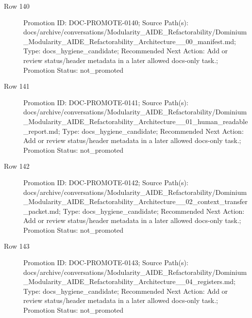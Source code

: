 \documentclass[9pt,a4paper,openany]{book}
\begin{document}
\begin{description}
\item[Row 140] Promotion ID: DOC-\allowbreak{}PROMOTE-\allowbreak{}0140; Source Path(s): docs/\allowbreak{}archive/\allowbreak{}conversations/\allowbreak{}Modularity\_\allowbreak{}AIDE\_\allowbreak{}Refactorability/\allowbreak{}Dominium\_\allowbreak{}Modularity\_\allowbreak{}AIDE\_\allowbreak{}Refactorability\_\allowbreak{}Architecture\_\allowbreak{}\_\allowbreak{}00\_\allowbreak{}manifest.\allowbreak{}md; Type: docs\_\allowbreak{}hygiene\_\allowbreak{}candidate; Recommended Next Action: Add or review status/\allowbreak{}header metadata in a later allowed docs-\allowbreak{}only task.\allowbreak{}; Promotion Status: not\_\allowbreak{}promoted
\item[Row 141] Promotion ID: DOC-\allowbreak{}PROMOTE-\allowbreak{}0141; Source Path(s): docs/\allowbreak{}archive/\allowbreak{}conversations/\allowbreak{}Modularity\_\allowbreak{}AIDE\_\allowbreak{}Refactorability/\allowbreak{}Dominium\_\allowbreak{}Modularity\_\allowbreak{}AIDE\_\allowbreak{}Refactorability\_\allowbreak{}Architecture\_\allowbreak{}\_\allowbreak{}01\_\allowbreak{}human\_\allowbreak{}readable\_\allowbreak{}report.\allowbreak{}md; Type: docs\_\allowbreak{}hygiene\_\allowbreak{}candidate; Recommended Next Action: Add or review status/\allowbreak{}header metadata in a later allowed docs-\allowbreak{}only task.\allowbreak{}; Promotion Status: not\_\allowbreak{}promoted
\item[Row 142] Promotion ID: DOC-\allowbreak{}PROMOTE-\allowbreak{}0142; Source Path(s): docs/\allowbreak{}archive/\allowbreak{}conversations/\allowbreak{}Modularity\_\allowbreak{}AIDE\_\allowbreak{}Refactorability/\allowbreak{}Dominium\_\allowbreak{}Modularity\_\allowbreak{}AIDE\_\allowbreak{}Refactorability\_\allowbreak{}Architecture\_\allowbreak{}\_\allowbreak{}02\_\allowbreak{}context\_\allowbreak{}transfer\_\allowbreak{}packet.\allowbreak{}md; Type: docs\_\allowbreak{}hygiene\_\allowbreak{}candidate; Recommended Next Action: Add or review status/\allowbreak{}header metadata in a later allowed docs-\allowbreak{}only task.\allowbreak{}; Promotion Status: not\_\allowbreak{}promoted
\item[Row 143] Promotion ID: DOC-\allowbreak{}PROMOTE-\allowbreak{}0143; Source Path(s): docs/\allowbreak{}archive/\allowbreak{}conversations/\allowbreak{}Modularity\_\allowbreak{}AIDE\_\allowbreak{}Refactorability/\allowbreak{}Dominium\_\allowbreak{}Modularity\_\allowbreak{}AIDE\_\allowbreak{}Refactorability\_\allowbreak{}Architecture\_\allowbreak{}\_\allowbreak{}04\_\allowbreak{}registers.\allowbreak{}md; Type: docs\_\allowbreak{}hygiene\_\allowbreak{}candidate; Recommended Next Action: Add or review status/\allowbreak{}header metadata in a later allowed docs-\allowbreak{}only task.\allowbreak{}; Promotion Status: not\_\allowbreak{}promoted

\end{description}
\end{document}
